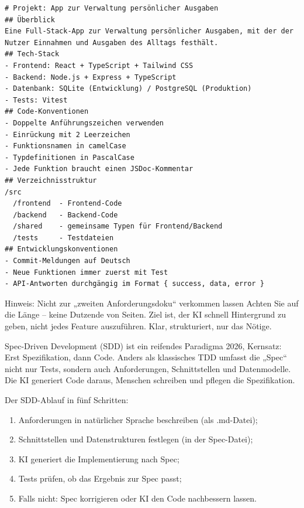 \begin{lstlisting}
# Projekt: App zur Verwaltung persönlicher Ausgaben
## Überblick
Eine Full-Stack-App zur Verwaltung persönlicher Ausgaben, mit der der Nutzer Einnahmen und Ausgaben des Alltags festhält.
## Tech-Stack
- Frontend: React + TypeScript + Tailwind CSS
- Backend: Node.js + Express + TypeScript
- Datenbank: SQLite (Entwicklung) / PostgreSQL (Produktion)
- Tests: Vitest
## Code-Konventionen
- Doppelte Anführungszeichen verwenden
- Einrückung mit 2 Leerzeichen
- Funktionsnamen in camelCase
- Typdefinitionen in PascalCase
- Jede Funktion braucht einen JSDoc-Kommentar
## Verzeichnisstruktur
/src
  /frontend  - Frontend-Code
  /backend   - Backend-Code
  /shared    - gemeinsame Typen für Frontend/Backend
  /tests     - Testdateien
## Entwicklungskonventionen
- Commit-Meldungen auf Deutsch
- Neue Funktionen immer zuerst mit Test
- API-Antworten durchgängig im Format { success, data, error }
\end{lstlisting}

\begin{tcbwarn}{Hinweis: Nicht zur „zweiten Anforderungsdoku“ verkommen lassen}
Achten Sie auf die Länge – keine Dutzende von Seiten. Ziel ist, der KI schnell Hintergrund zu geben, nicht jedes Feature auszuführen. Klar, strukturiert, nur das Nötige.

\end{tcbwarn}


Spec-Driven Development (SDD) ist ein reifendes Paradigma 2026, Kernsatz: Erst Spezifikation, dann Code. Anders als klassisches TDD umfasst die „Spec“ nicht nur Tests, sondern auch Anforderungen, Schnittstellen und Datenmodelle. Die KI generiert Code daraus, Menschen schreiben und pflegen die Spezifikation.

Der SDD-Ablauf in fünf Schritten:

\begin{enumerate}
  \item Anforderungen in natürlicher Sprache beschreiben (als .md-Datei);
  \item Schnittstellen und Datenstrukturen festlegen (in der Spec-Datei);
  \item KI generiert die Implementierung nach Spec;
  \item Tests prüfen, ob das Ergebnis zur Spec passt;
  \item Falls nicht: Spec korrigieren oder KI den Code nachbessern lassen.
\end{enumerate}

